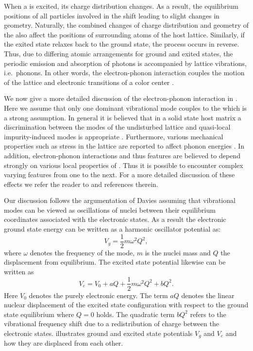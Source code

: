     When a \cc is excited, its charge distribution changes. As a result, the equilibrium positions of all particles involved in the \cc shift leading to slight changes in \cc geometry. Naturally, the combined changes of charge distribution and geometry of the \cc also affect the positions of surrounding atoms of the host lattice. Similarly, if the exited state relaxes back to the ground state, the process occurs in reverse. Thus, due to differing atomic arrangements for ground and exited states, the periodic emission and absorption of photons is accompanied by lattice vibrations, i.e.\ phonons. In other words, the electron-phonon interaction couples the motion of the lattice and electronic transitions of a color center \cite{Davies1981, Zaitsev2000}.

    We now give a more detailed discussion of the electron-phonon interaction in \sivs. Here we assume that only one dominant vibrational mode couples to the \cc which is a strong assumption. In general it is believed that in a solid state host matrix a discrimination between the modes of the undisturbed lattice and quasi-local impurity-induced modes is appropriate \cite{Zaitsev2000, Feng1993b, Solin1970}. Furthermore, various mechanical properties such as stress in the lattice are reported to affect phonon energies \cite{Grimsditch1978}. In addition, electron-phonon interactions and thus \psb features are believed to depend strongly on various local properties of \ccs \cite{Sternschulte1994, Huttner1995}. Thus it is possible to encounter complex varying \psb features from one \siv to the next. For a more detailed discussion of these effects we refer the reader to \cite{Neu2012, Riedrich-moller2014} and references therein.

    Our discussion follows the argumentation of Davies \cite{Davies1981} assuming that vibrational modes can be viewed as oscillations of nuclei between their equilibrium coordinates associated with the electronic states. As a result the electronic ground state energy can be written as a harmonic oscillator potential as:
    \begin{equation}
      V_g = \frac{1}{2} m \omega^2 Q^2 ,
    \end{equation}
    where $\omega$ denotes the frequency of the mode, $m$ is the nuclei mass and $Q$ the displacement from equilibrium. The excited state potential likewise can be written as
    \begin{equation}
      V_e = V_0 + aQ + \frac{1}{2} m \omega^2 Q^2 + bQ^2 .
    \end{equation}
    Here $V_0$ denotes the purely electronic energy. The term $aQ$ denotes the linear nuclear displacement of the excited state configuration with respect to the ground state equilibrium where $Q = 0$ holds.
    The quadratic term $b Q^2$ refers to the vibrational frequency shift due to a redistribution of charge between the electronic states.  illustrates ground and excited state potentials $V_g$ and $V_e$ and how they are displaced from each other.

